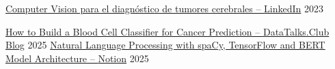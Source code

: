 

\begin{cventries}

\cventry
  {} %
  {\href{https://www.linkedin.com/pulse/computer-vision-para-el-diagnóstico-de-tumores-cerebrales-rios}{Computer Vision para el diagnóstico de tumores cerebrales -- {\normalfont LinkedIn}}} %
  {} %
  {2023} %
  {
  }

  \cventry
  {} %
  {\href{https://datatalks.club/blog/how-to-build-blood-cell-classifier-for-cancer-prediction-case-study-from-ml-zoomcamp.html}{How to Build a Blood Cell Classifier for Cancer Prediction -- {\normalfont DataTalks.Club Blog}}} %
  {} %
  {2025} %
  {
  }
\cventry
  {} %
  {\href{https://volcano-camp-325.notion.site/Natural-Language-Processing-using-spaCy-TensorFlow-and-BERT-model-architecture-2455067176b38018b7defdca1005c07a}{Natural Language Processing with spaCy, TensorFlow and BERT Model Architecture -- {\normalfont Notion}}} %
  {} %
  {2025} %
  {
  }
\end{cventries}

